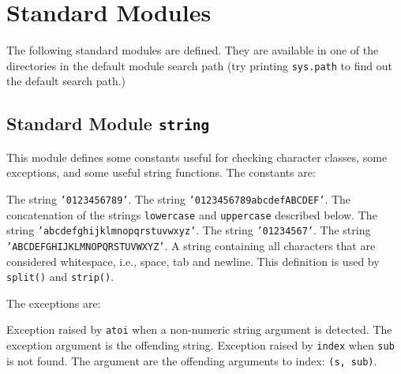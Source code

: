 \section{Standard Modules}

The following standard modules are defined.
They are available in one of the directories in the default module
search path (try printing
{\tt sys.path}
to find out the default search path.)

\subsection{Standard Module {\tt string}}

This module defines some constants useful for checking character
classes, some exceptions, and some useful string functions.
The constants are:
\begin{description}
The string
{\tt '0123456789'}.
The string
{\tt '0123456789abcdefABCDEF'}.
The concatenation of the strings	
{\tt lowercase}
and
{\tt uppercase}
described below.
The string
{\tt 'abcdefghijklmnopqrstuvwxyz'}.
The string
{\tt '01234567'}.
The string
{\tt 'ABCDEFGHIJKLMNOPQRSTUVWXYZ'}.
A string containing all characters that are considered whitespace,
i.e.,
space, tab and newline.
This definition is used by
{\tt split()}
and
{\tt strip()}.
\end{description}

The exceptions are:
\begin{description}
Exception raised by
{\tt atoi}
when a non-numeric string argument is detected.
The exception argument is the offending string.
Exception raised by
{\tt index}
when
{\tt sub}
is not found.
The argument are the offending arguments to index: {\tt (s, sub)}.
\end{description}

